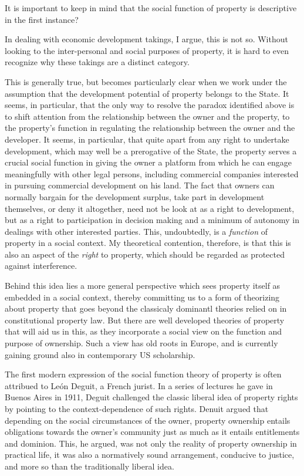 It is important to keep in mind that the social function of property is descriptive in the first instance?

In dealing with economic development takings, I argue, this is not so. Without looking to the inter-personal and social purposes of property, it is hard to even recognize why these takings are a distinct category.

This is generally true, but becomes particularly clear when we work under the assumption that the development potential of property belongs to the State. It seems, in particular, that the only way to resolve the paradox identified above is to shift attention from the relationship between the owner and the property, to the property's function in regulating the relationship between the owner and the developer. It seems, in particular, that quite apart from any right to undertake development, which may well be a prerogative of the State, the property serves a crucial social function in giving the owner a platform from which he can engage meaningfully with other legal persons, including commercial companies interested in pursuing commercial development on his land. The fact that owners can normally bargain for the development surplus, take part in development themselves, or deny it altogether, need not be look at as a right to development, but as a right to participation in decision making and a minimum of autonomy in dealings with other interested parties. This, undoubtedly, is a {\it function} of property in a social context. My theoretical contention, therefore, is that this is also an aspect of the {\it right} to property, which should be regarded as protected against interference. 

Behind this idea lies a more general perspective which sees property itself as embedded in a social context, thereby committing us to a form of theorizing about property that goes beyond the classicaly dominantl theories relied on in constitutional property law. But there are well developed theories of property that will aid us in this, as they incorporate a social view on the function and purpose of ownership. Such a view has old roots in Europe, and is currently gaining ground also in contemporary US scholarship. 

The first modern expression of the social function theory of property is often attribued to Le{\'o}n Deguit, a French jurist. In a series of lectures he gave in Buenos Aires in 1911, Deguit challenged the classic liberal idea of property rights by pointing to the context-dependence of such rights. Denuit argued that depending on the social circumstances of the owner, property ownership entails obligations towards the owner's community just as much as it entails entitlements and dominion. This, he argued, was not only the reality of property ownership in practical life, it was also a normatively sound arrangement, conducive to justice, and more so than the traditionally liberal idea.

